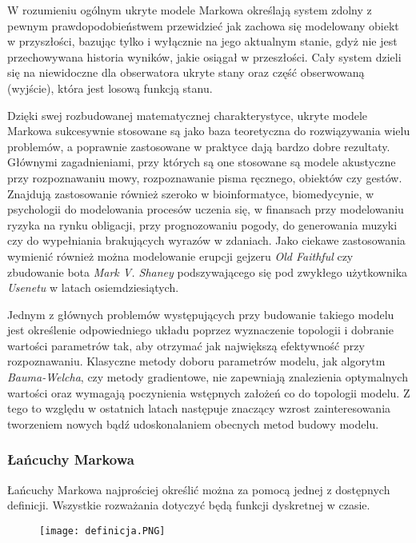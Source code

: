 W rozumieniu ogólnym ukryte modele Markowa określają system zdolny z pewnym prawdopodobieństwem przewidzieć jak zachowa się modelowany obiekt w przyszłości, bazując tylko i wyłącznie na jego aktualnym stanie, gdyż nie jest przechowywana historia wyników, jakie osiągał w przeszłości. Cały system dzieli się na niewidoczne dla obserwatora ukryte stany oraz część obserwowaną (wyjście), która jest losową funkcją stanu.

Dzięki swej rozbudowanej matematycznej charakterystyce, ukryte modele Markowa sukcesywnie stosowane są jako baza teoretyczna do rozwiązywania wielu problemów, a poprawnie zastosowane w praktyce dają bardzo dobre rezultaty. Głównymi zagadnieniami, przy których są one stosowane są modele akustyczne przy rozpoznawaniu mowy, rozpoznawanie pisma ręcznego, obiektów czy gestów. Znajdują zastosowanie również szeroko w bioinformatyce, biomedycynie, w psychologii do modelowania procesów uczenia się, w finansach przy modelowaniu ryzyka na rynku obligacji, przy prognozowaniu pogody, do generowania muzyki czy do wypełniania brakujących wyrazów w zdaniach. Jako ciekawe zastosowania wymienić również można modelowanie erupcji gejzeru \textit{Old Faithful} czy zbudowanie bota \textit{Mark V. Shaney} podszywającego się pod zwykłego użytkownika \textit{Usenetu} w latach osiemdziesiątych.

Jednym z głównych problemów występujących przy budowanie takiego modelu jest określenie odpowiedniego układu poprzez wyznaczenie topologii i dobranie wartości parametrów tak, aby otrzymać jak największą efektywność przy rozpoznawaniu. Klasyczne metody doboru parametrów modelu, jak algorytm \textit{Bauma-Welcha}, czy metody gradientowe, nie zapewniają znalezienia optymalnych wartości oraz wymagają poczynienia wstępnych założeń co do topologii modelu. Z tego to względu w ostatnich latach następuje znaczący wzrost zainteresowania tworzeniem nowych bądź udoskonalaniem obecnych metod budowy modelu.

\newpage

\subsubsection{Łańcuchy Markowa}

Łańcuchy Markowa najprościej określić można za pomocą jednej z dostępnych definicji. Wszystkie rozważania dotyczyć będą funkcji dyskretnej w czasie.

\begin{figure}[h!]
	\centering
	\texttt{[image: definicja.PNG]}
	\label{definicja}
\end{figure}

